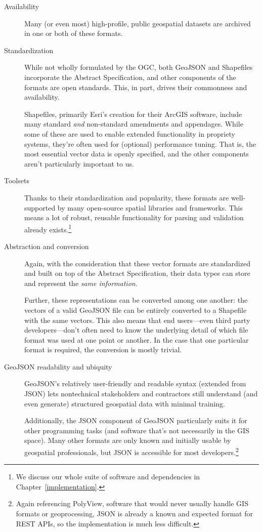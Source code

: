 \begin{description}
  \item[Availability] Many (or even most) high-profile, public geospatial datasets are archived in one or both of these formats.
  \item[Standardization] While not wholly formulated by the OGC, both GeoJSON and Shapefiles incorporate the Abstract Specification, and other components of the formats are open standards. This, in part, drives their commonness and availability.
  
Shapefiles, primarily Esri's creation for their ArcGIS software, include many standard \textit{and} non-standard amendments and appendages. While some of these are used to enable extended functionality in propriety systems, they're often used for (optional) performance tuning. That is, the most essential vector data is openly specified, and the other components aren't particularly important to us.

\item[Toolsets] Thanks to their standardization and popularity, these formats  are well-supported by many open-source spatial libraries and frameworks. This means a lot of robust, reusable functionality for parsing and validation already exists.\footnote{We discuss our whole suite of software and dependencies in Chapter~\ref{implementation}.}

\item[Abstraction and conversion] Again, with the consideration that these vector formats are standardized and built on top of the Abstract Specification, their data types can store and represent the \textit{same information}.

Further, these representations can be converted among one another: the vectors of a valid GeoJSON file can be entirely converted to a Shapefile with the same vectors. This also means that end users---even third party developers---don't often need to know the underlying detail of which file format was used at one point or another. In the case that one particular format is required, the conversion is mostly trivial.

\item[GeoJSON readability and ubiquity] GeoJSON's relatively user-friendly and readable syntax (extended from JSON) lets nontechnical stakeholders and contractors still understand (and even generate) structured geospatial data with minimal training.

Additionally, the JSON component of GeoJSON particularly suits it for other programming tasks (and software that's not necessarily in the GIS space). Many other formats are only known and initially usable by geospatial professionals, but JSON is accessible for most developers.\footnote{Again referencing PolyView, software that would never usually handle GIS formats or geoprocessing, JSON is already a known and expected format for REST APIs, so the implementation is much less difficult.}

\end{description}

